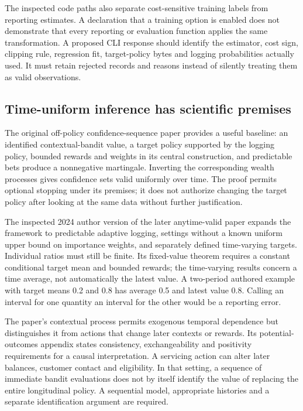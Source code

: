 The inspected code paths also separate cost-sensitive training labels from reporting estimates. A declaration that a training option is enabled does not demonstrate that every reporting or evaluation function applies the same transformation. A proposed CLI response should identify the estimator, cost sign, clipping rule, regression fit, target-policy bytes and logging probabilities actually used. It must retain rejected records and reasons instead of silently treating them as valid observations.~\citep{exec24_policycxx_vw,exec24_policycxx_comparison}

\subsection{Time-uniform inference has scientific premises}
The original off-policy confidence-sequence paper provides a useful baseline: an identified contextual-bandit value, a target policy supported by the logging policy, bounded rewards and weights in its central construction, and predictable bets produce a nonnegative martingale. Inverting the corresponding wealth processes gives confidence sets valid uniformly over time. The proof permits optional stopping under its premises; it does not authorize changing the target policy after looking at the same data without further justification.~\citep{exec24_policycxx_cs2021}

The inspected 2024 author version of the later anytime-valid paper expands the framework to predictable adaptive logging, settings without a known uniform upper bound on importance weights, and separately defined time-varying targets. Individual ratios must still be finite. Its fixed-value theorem requires a constant conditional target mean and bounded rewards; the time-varying results concern a time average, not automatically the latest value. A two-period authored example with target means 0.2 and 0.8 has average 0.5 and latest value 0.8. Calling an interval for one quantity an interval for the other would be a reporting error.~\citep{exec24_policycxx_anytime2024,exec24_policycxx_comparison}

The paper's contextual process permits exogenous temporal dependence but distinguishes it from actions that change later contexts or rewards. Its potential-outcomes appendix states consistency, exchangeability and positivity requirements for a causal interpretation. A servicing action can alter later balances, customer contact and eligibility. In that setting, a sequence of immediate bandit evaluations does not by itself identify the value of replacing the entire longitudinal policy. A sequential model, appropriate histories and a separate identification argument are required.~\citep{exec24_policycxx_anytime2024,exec24_policycxx_comparison}

